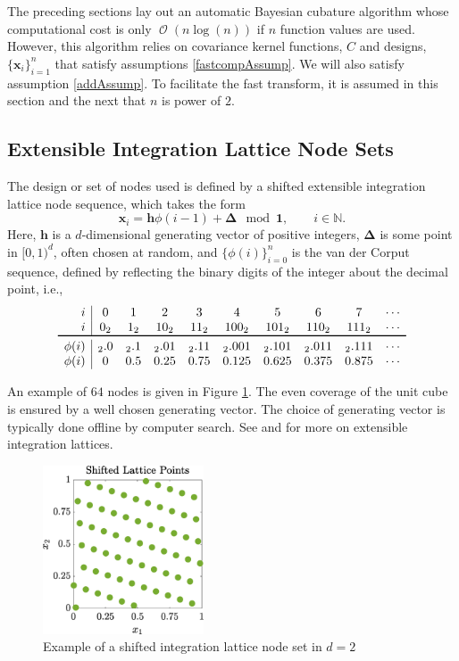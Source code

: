 \documentclass[twocolumn]{svjour3}          %
\DeclareMathOperator{\Order}{{\mathcal O}}
\newcommand{\bm}[1]{\boldsymbol{#1}}
\newcommand{\naturals}{\mathbb{N}}
\newcommand{\vDelta}{{\boldsymbol{\Delta}}}
\newcommand{\vh}{\bm{h}}
\newcommand{\vx}{\bm{x}}
\newcommand{\vone}{\bm{1}}
\begin{document}
The preceding sections lay out an automatic Bayesian cubature algorithm whose computational cost is only $\Order(n \log(n))$ if $n$ function values are used.  However, this algorithm relies on covariance kernel functions, $C$ and designs, $\{\vx_i\}_{i=1}^n$ that satisfy assumptions \eqref{fastcompAssump}.  We will also satisfy assumption \eqref{addAssump}.  To facilitate the fast transform, it is assumed in this section and the next that $n$ is power of $2$.  


\subsection{Extensible Integration Lattice Node Sets}

The design or set of nodes used is defined by a shifted extensible integration lattice node sequence, which takes the form
\begin{equation*}
\vx_{i} = \vh \phi(i-1) + \vDelta \mod \vone, \qquad i \in \naturals.
\end{equation*} 
Here, $\vh$ is a $d$-dimensional generating vector of positive integers, $\vDelta$ is some point in $[0,1)^d$, often chosen at random, and $\{\phi(i)\}_{i=0}^n$ is the van der Corput sequence, defined by reflecting the binary digits of the integer about the decimal point, i.e., 
\begin{equation} \label{vdCDef}
\begin{array}{r|ccccccccccccc}
i & 0 & 1 & 2 & 3 & 4 &  5 & 6 & 7 & \cdots \\
i & 0_2 & 1_2 & 10_2 & 11_2 & 100_2 & 101_2 & 110_2 & 111_2  & \cdots\\
\toprule
\phi(i) & {}_2.0 &  {}_2.1 & {}_2.01 &  {}_2.11  & {}_2.001 &  {}_2.101 & {}_2.011 &  {}_2.111 & \cdots\\
\phi(i) & 0 &  0.5 &  0.25 & 0.75 &  0.125 & 0.625  &  0.375 & 0.875 & \cdots
\end{array}
\end{equation}

An example of $64$ nodes is given in Figure  \ref{latticefig}.  The even coverage of the unit cube is ensured by a well chosen generating vector.  The choice of generating vector is typically done offline by computer search.  See \cite{DicEtal14a} and \cite{HicNie03a} for more on extensible integration lattices.
\begin{figure}[htp]
	\centering
	\includegraphics[height=5cm]{ShiftedLatticePoints}
	\caption{Example of a shifted integration lattice node set  in $d=2$ \label{latticefig} }
\end{figure}
\end{document}
